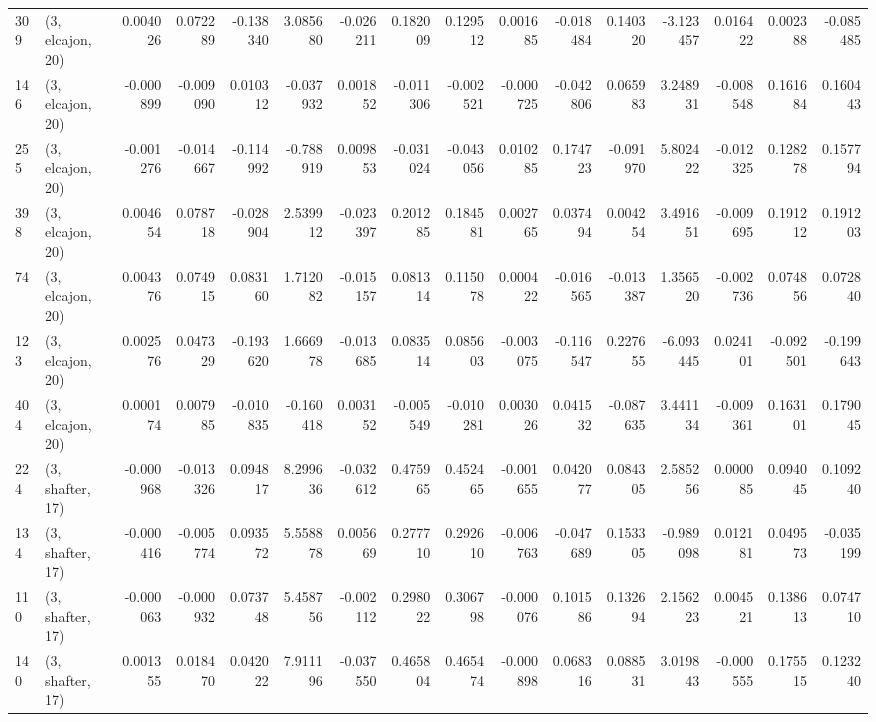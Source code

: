 \begin{tabular}{llrrrrrrrrrrrrrr}
309 &  (3, elcajon, 20) &   0.004026 &  0.072289 & -0.138340 &    3.085680 & -0.026211 &   0.182009 &  0.129512 &  0.001685 & -0.018484 &  0.140320 &   -3.123457 &  0.016422 &  0.002388 & -0.085485 \\
146 &  (3, elcajon, 20) &  -0.000899 & -0.009090 &  0.010312 &   -0.037932 &  0.001852 &  -0.011306 & -0.002521 & -0.000725 & -0.042806 &  0.065983 &    3.248931 & -0.008548 &  0.161684 &  0.160443 \\
255 &  (3, elcajon, 20) &  -0.001276 & -0.014667 & -0.114992 &   -0.788919 &  0.009853 &  -0.031024 & -0.043056 &  0.010285 &  0.174723 & -0.091970 &    5.802422 & -0.012325 &  0.128278 &  0.157794 \\
398 &  (3, elcajon, 20) &   0.004654 &  0.078718 & -0.028904 &    2.539912 & -0.023397 &   0.201285 &  0.184581 &  0.002765 &  0.037494 &  0.004254 &    3.491651 & -0.009695 &  0.191212 &  0.191203 \\
74  &  (3, elcajon, 20) &   0.004376 &  0.074915 &  0.083160 &    1.712082 & -0.015157 &   0.081314 &  0.115078 &  0.000422 & -0.016565 & -0.013387 &    1.356520 & -0.002736 &  0.074856 &  0.072840 \\
123 &  (3, elcajon, 20) &   0.002576 &  0.047329 & -0.193620 &    1.666978 & -0.013685 &   0.083514 &  0.085603 & -0.003075 & -0.116547 &  0.227655 &   -6.093445 &  0.024101 & -0.092501 & -0.199643 \\
404 &  (3, elcajon, 20) &   0.000174 &  0.007985 & -0.010835 &   -0.160418 &  0.003152 &  -0.005549 & -0.010281 &  0.003026 &  0.041532 & -0.087635 &    3.441134 & -0.009361 &  0.163101 &  0.179045 \\
224 &  (3, shafter, 17) &  -0.000968 & -0.013326 &  0.094817 &    8.299636 & -0.032612 &   0.475965 &  0.452465 & -0.001655 &  0.042077 &  0.084305 &    2.585256 &  0.000085 &  0.094045 &  0.109240 \\
134 &  (3, shafter, 17) &  -0.000416 & -0.005774 &  0.093572 &    5.558878 &  0.005669 &   0.277710 &  0.292610 & -0.006763 & -0.047689 &  0.153305 &   -0.989098 &  0.012181 &  0.049573 & -0.035199 \\
110 &  (3, shafter, 17) &  -0.000063 & -0.000932 &  0.073748 &    5.458756 & -0.002112 &   0.298022 &  0.306798 & -0.000076 &  0.101586 &  0.132694 &    2.156223 &  0.004521 &  0.138613 &  0.074710 \\
140 &  (3, shafter, 17) &   0.001355 &  0.018470 &  0.042022 &    7.911196 & -0.037550 &   0.465804 &  0.465474 & -0.000898 &  0.068316 &  0.088531 &    3.019843 & -0.000555 &  0.175515 &  0.123240 \\

\end{tabular}
